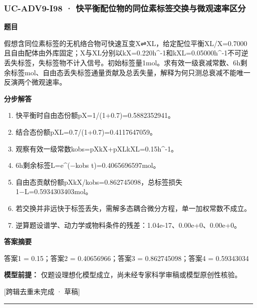 \documentclass[UTF8,11pt,a4paper]{ctexart}
\begin{document}
\subsubsection*{UC-ADV9-I98 · 快平衡配位物的同位素标签交换与微观速率区分}
\noindent\textbf{题目}\par
假想含同位素标签的无机络合物可快速互变X⇌XL，给定配位平衡XL/X=0.7000且自由配体由外库固定；X与XL分别以kX=0.220h\textasciicircum{}-1和kXL=0.05000h\textasciicircum{}-1不可逆丢失标签，失标签物不计入信号。初始标签量1mol。求有效一级衰减常数、6h剩余标签mol、自由态丢失标签通量贡献及总丢失量，解释为何只测总衰减不能唯一反演两个微观速率。\par
\medskip\noindent\textbf{分步解答}
\begin{enumerate}
\item 快平衡时自由态份额pX=1/(1+0.7)=0.5882352941。
\item 结合态份额pXL=0.7/(1+0.7)=0.4117647059。
\item 观察有效一级常数kobs=pXkX+pXLkXL=0.15h\textasciicircum{}-1。
\item 6h剩余标签L=e\textasciicircum{}(−kobs t)=0.4065696597mol。
\item 自由态贡献份额pXkX/kobs=0.862745098，总标签损失1−L=0.5934303403mol。
\item 若交换并非远快于标签丢失，需解多态耦合微分方程，单一加权常数不成立。
\item 逆算题设谱学、动力学或物料条件的残差：1.04e-17、0.00e+0、0.00e+0。
\end{enumerate}
\noindent\textbf{答案摘要}\par
答案1 = 0.15；答案2 = 0.40656966；答案3 = 0.862745098；答案4 = 0.59343034\par
\noindent\textbf{模型前提：}
仅题设理想化模型成立，尚未经专家科学审稿或模型原创性核验。\par
\noindent\textcolor{red!65!black}{[跨辑去重未完成 · 草稿]} \par
\medskip\hrule\medskip
{}
\end{document}
